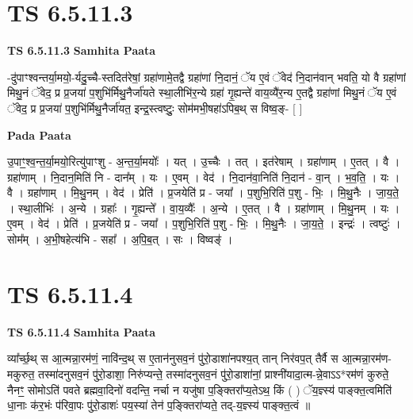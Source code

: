 \documentclass[17pt]{extarticle}
\begin{document}

\section{ TS 6.5.11.3 }

\textbf{TS 6.5.11.3 } \newline
\textbf{Samhita Paata} \newline

-दु॑पाꣳश्वन्तर्या॒मयो॒-र्यदु॒च्चै-स्तदित॑रेषां॒ ग्रहा॑णामे॒तद्वै ग्रहा॑णां नि॒दानं॒ ॅय ए॒वं ॅवेद॑ नि॒दान॑वान् भवति॒ यो वै ग्रहा॑णां मिथु॒नं ॅवेद॒ प्र प्र॒जया॑ प॒शुभि॑र्मिथु॒नैर्जा॑यते स्था॒लीभि॑र॒न्ये ग्रहा॑ गृ॒ह्यन्ते॑ वाय॒व्यै॑र॒न्य ए॒तद्वै ग्रहा॑णां मिथु॒नं ॅय ए॒वं ॅवेद॒ प्र प्र॒जया॑ प॒शुभि॑र्मिथु॒नैर्जा॑यत॒ इन्द्र॒स्त्वष्टुः॒ सोम॑मभी॒षहा॑ऽपिब॒थ् स विष्व॒ङ्- [  ] \newline

\textbf{Pada Paata} \newline

उ॒पाꣳ॒॒श्व॒न्त॒र्या॒मयो॒रित्यु॑पाꣳशु - अ॒न्त॒र्या॒मयोः᳚ । यत् । उ॒च्चैः । तत् । इत॑रेषाम् । ग्रहा॑णाम् । ए॒तत् । वै । ग्रहा॑णाम् । नि॒दान॒मिति॑ नि - दान᳚म् । यः । ए॒वम् । वेद॑ । नि॒दान॑वा॒निति॑ नि॒दान॑ - वा॒न् । भ॒व॒ति॒ । यः । वै । ग्रहा॑णाम् । मि॒थु॒नम् । वेद॑ । प्रेति॑ । प्र॒जयेति॑ प्र - जया᳚ । प॒शुभि॒रिति॑ प॒शु - भिः॒ । मि॒थु॒नैः । जा॒य॒ते॒ । स्था॒लीभिः॑ । अ॒न्ये । ग्रहाः᳚ । गृ॒ह्यन्ते᳚ । वा॒य॒व्यैः᳚ । अ॒न्ये । ए॒तत् । वै । ग्रहा॑णाम् । मि॒थु॒नम् । यः । ए॒वम् । वेद॑ । प्रेति॑ । प्र॒जयेति॑ प्र - जया᳚ । प॒शुभि॒रिति॑ प॒शु - भिः॒ । मि॒थु॒नैः । जा॒य॒ते॒ । इन्द्रः॑ । त्वष्टुः॑ । सोम᳚म् । अ॒भी॒षहेत्य॑भि - सहा᳚ । अ॒पि॒ब॒त् । सः । विष्वङ्॑ ।  \newline





\section{ TS 6.5.11.4 }

\textbf{TS 6.5.11.4 } \newline
\textbf{Samhita Paata} \newline

व्या᳚र्च्छ॒थ् स आ॒त्मन्ना॒रम॑णं॒ नावि॑न्द॒थ् स ए॒तान॑नुसव॒नं पु॑रो॒डाशा॑नपश्य॒त् तान् निर॑वप॒त् तैर्वै स आ॒त्मन्ना॒रम॑ण-मकुरुत॒ तस्मा॑दनुसव॒नं पु॑रो॒डाशा॒ निरु॑प्यन्ते॒ तस्मा॑दनुसव॒नं पु॑रो॒डाशा॑नां॒ प्राश्नी॑यादा॒त्म-न्ने॒वाऽऽ*रम॑णं कुरुते॒ नैनꣳ॒॒ सोमोऽति॑ पवते ब्रह्मवा॒दिनो॑ वदन्ति॒ नर्चा न यजु॑षा प॒ङ्क्तिरा᳚प्य॒तेऽथ॒ किं ( ) ॅय॒ज्ञ्स्य॑ पाङ्क्त॒त्वमिति॑ धा॒नाः क॑र॒भंः प॑रिवा॒पः पु॑रो॒डाशः॑ पय॒स्या॑ तेन॑ प॒ङ्क्तिरा॑प्यते॒ तद्-य॒ज्ञ्स्य॑ पाङ्क्त॒त्वं ॥ \newline
\end{document}
